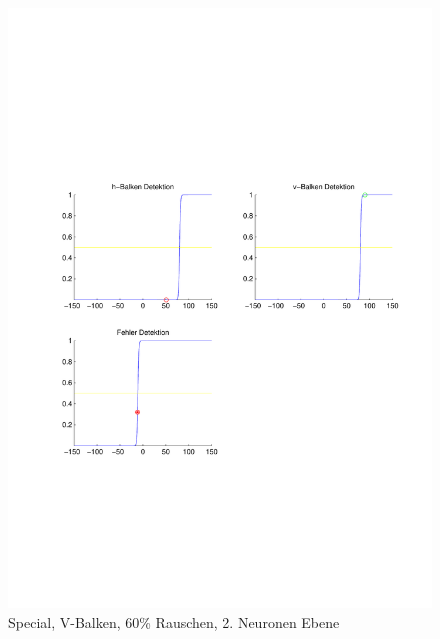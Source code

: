 \begin{figure}[hbt]
\begin{minipage}{0.8 \textwidth}
		\includegraphics[width=\textwidth]{./Bilder/Auswertung/Endergebnis/TypeSpecial_Rauschen60_V_Line_Layer2}
		\caption{Special, V-Balken, 60\% Rauschen, 2. Neuronen Ebene}
		\label{Special_V_60_2}
	\end{minipage}
\end{figure}

